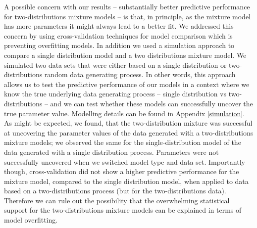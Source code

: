 \documentclass[
  english,
  man,floatsintext]{apa7}
\begin{document}
A possible concern with our results -- substantially better predictive performance for two-distributions mixture models -- is that, in principle, as the mixture model has more parameters it might always lead to a better fit. We addressed this concern by using cross-validation techniques for model comparison which is preventing overfitting models. In addition we used a simulation approach to compare a single distribution model and a two distributions mixture model. We simulated two data sets that were either based on a single distribution or two-distributions random data generating process. In other words, this approach allows us to test the predictive performance of our models in a context where we know the true underlying data generating process -- single distribution vs two-distributions -- and we can test whether these models can successfully uncover the true parameter value. Modelling details can be found in Appendix \ref{simulation}. As might be expected, we found, that the two-distribution mixture was successful at uncovering the parameter values of the data generated with a two-distributions mixture models; we observed the same for the single-distribution model of the data generated with a single distribution process. Parameters were not successfully uncovered when we switched model type and data set. Importantly though, cross-validation did not show a higher predictive performance for the mixture model, compared to the single distribution model, when applied to data based on a two-distributions process (but for the two-distributions data). Therefore we can rule out the possibility that the overwhelming statistical support for the two-distributions mixture models can be explained in terms of model overfitting.
\end{document}
